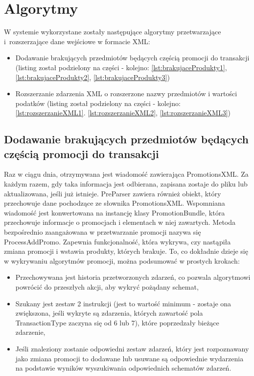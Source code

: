 \documentclass[a4paper]{book}
\begin{document}
\section{Algorytmy}
W systemie wykorzystane zostały następujące algorytmy przetwarzające i~rozszerzające dane wejściowe w formacie XML:
\begin{itemize}
	\item Dodawanie brakujących przedmiotów będących częścią promocji do transakcji (listing został podzielony na części - kolejno: \ref{lst:brakujaceProdukty1}, \ref{lst:brakujaceProdukty2}, \ref{lst:brakujaceProdukty3})
	\item Rozszerzanie zdarzenia XML o rozszerzone nazwy przedmiotów i wartości podatków (listing został podzielony na części - kolejno: \ref{lst:rozszerzanieXML1}. \ref{lst:rozszerzanieXML2}, \ref{lst:rozszerzanieXML3})
\end{itemize}
\subsection{Dodawanie brakujących przedmiotów będących częścią promocji do transakcji}
Raz w ciągu dnia, otrzymywana jest wiadomość zawierająca PromotionsXML. Za każdym razem, gdy taka informacja jest odbierana, zapisana zostaje do pliku lub aktualizowana, jeśli już istnieje. PreParser zawiera również obiekt, który przechowuje dane pochodzące ze słownika PromotionsXML. Wspomniana wiadomość jest konwertowana na instancję klasy PromotionBundle, która przechowuje informacje o promocjach i elementach w niej zawartych. Metoda bezpośrednio zaangażowana w przetwarzanie promocji nazywa się ProcessAddPromo. Zapewnia funkcjonalność, która wykrywa, czy nastąpiła zmiana promocji i wstawia produkty, których brakuje. To, co dokładnie dzieje się w wykrywaniu algorytmów promocji, można podsumować w prostych krokach:
\begin{itemize}
	\item Przechowywana jest historia przetworzonych zdarzeń, co pozwala algorytmowi powrócić do przeszłych akcji, aby wykryć pożądany schemat,
	\item Szukany jest zestaw 2 instrukcji (jest to wartość minimum - zostaje ona zwiększona, jeśli wykryte są zdarzenia, których zawartość pola TransactionType zaczyna się od 6 lub 7), które poprzedzały bieżące zdarzenie,
	\item Jeśli znaleziony zostanie odpowiedni zestaw zdarzeń, który jest rozpoznawany jako zmiana promocji to dodawane lub usuwane są odpowiednie wydarzenia na podstawie wyników wyszukiwania odpowiednich schematów zdarzeń.
\end{itemize}
\end{document}
